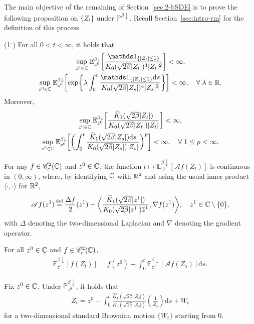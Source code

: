 \documentclass[12pt, twoside]{article}
\numberwithin{figure}{section}
\newcommand{\1}{\mathds 1}
\newcommand{\C}{{\mathscr C}}
\newcommand{\da}{{\downarrow}}
\newcommand{\la}{{\langle}}
\newcommand{\ra}{{\rangle}}
\newcommand{\ms}{\mathscr}
\renewcommand{\P}{{\mathbb P}}
\newcommand{\E}{{\mathbb E}}
\renewcommand{\d}{{\mathrm d}}
\newcommand{\R}{{\Bbb R}}
\newcommand{\2}{{\mathbf 1}}
\newcommand{\defeq}{{\stackrel{\rm def}{=}}}
\newcommand{\cc}{{^\circ}}
\newcommand{\hK}{{\widehat{K}}}
\begin{document}
The main objective of the remaining of Section~\ref{sec:2-bSDE} is to prove  the following proposition on $\{Z_t\}$ under $\P^{\beta\da}$. Recall Section~\ref{sec:intro-rm} for the definition of this process. 

\begin{prop}\label{prop:MP}
{\rm (1$\cc$)} For all $0<t<\infty$, it holds that 
\begin{gather}
\sup_{z^0\in \Bbb C}\E^{\beta\da}_{z^0}\biggl[ \frac{\1_{\{|Z_t|\leq 1\}}}{K_0(\sqrt{2\beta}|Z_t|)^4|Z_t|^2}\biggr]<\infty,\label{MP:mom00}\\
\sup_{z^0\in \Bbb C}\E^{\beta\da}_{z^0}\biggl[\exp\biggl\{\lambda \int_0^t \frac{\1_{\{|Z_s|\leq 1\}}\d s}{K_0(\sqrt{2\beta}|Z_s|)^4|Z_s|^2}\biggr\}\biggr]<\infty,\quad \forall\;\lambda\in \R.\label{MP:mom0}
\end{gather}
Moreover,
\begin{gather}
\sup_{z^0\in \Bbb C}\E^{\beta\da}_{z^0}\biggl[\frac{\hK_1(\sqrt{2\beta}|Z_t|)}{K_0(\sqrt{2\beta}|Z_t|)|Z_t|}\biggr]<\infty,\label{MP:mom1}\\
\sup_{z^0\in \Bbb C}\E^{\beta\da}_{z^0}\biggl[\biggl(\int_0^t\frac{\hK_1(\sqrt{2\beta}|Z_s|)\d s}{K_0(\sqrt{2\beta}|Z_s|)|Z_s|}\biggr)^p
\biggr]<\infty,\quad \forall\;1\leq p<\infty.\label{MP:mom}
\end{gather}

\noindent {\rm (2$\cc$)} For any $f\in \C_c^2(\Bbb C)$ and $z^0\in \Bbb C$, the function 
 $t\mapsto \E^{\beta\da}_{z^0}[\ms Af(Z_t)]$ is continuous in $(0,\infty)$,
where, by identifying $\Bbb C$ with $\R^2$ and using the usual inner product $\la \cdot,\cdot\ra$ for $\R^2$,
\begin{align}\label{def:A-1}
\ms Af(z^1)\,\defeq \,\frac{\Delta f}{2}(z^1)-\biggl\langle\frac{\hK_1(\sqrt{2\beta}|z^1|)}{K_0(\sqrt{2\beta}|z^1|)\overline{z}^1},\nabla f(z^1)\biggr\rangle,\quad z^1\in \Bbb C\setminus\{0\},
\end{align}
with $\Delta$ denoting the two-dimensional Laplacian and $\nabla$ denoting the gradient operator. \smallskip 

\noindent {\rm (3$\cc$)} For all $z^0\in \Bbb C$ and $f\in \C_c^2(\Bbb C)$, 
\begin{align}\label{Zt:geneq}
\E^{\beta\da}_{z^0}[f(Z_t)]=f(z^0)+\int_0^t \E^{\beta\da}_{z^0}[\ms Af(Z_s)]\d s.
\end{align}

\noindent {\rm (4$\cc$)} Fix $z^0\in \Bbb C$. Under $\P^{\beta\da}_{z^0}$, it holds that
\begin{align}\label{Zi:SDE}
Z_t=z^0-\int_0^t \frac{\hK_1(\sqrt{2\beta}|Z_s|)}{K_0(\sqrt{2\beta}|Z_s|)}\left(\frac{1}{\overline{Z}_s}\right)\d s+W_t
\end{align}
for a two-dimensional standard Brownian motion $\{W_t\}$ starting from $0$.
\end{prop}
\end{document}
